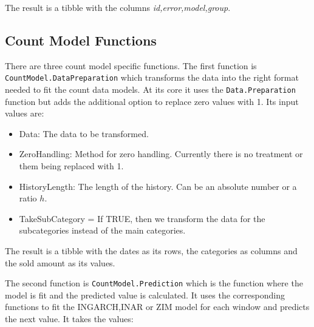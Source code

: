 The result is a tibble with the columns \textit{id,error,model,group}. 

\subsection{Count Model Functions}
\label{sec:Count Model Functions}


There are three count model specific functions. The first function is \texttt{CountModel.DataPreparation} which transforms the data into the right format needed to fit the count data models. At its core it uses the \texttt{Data.Preparation} function but adds the additional option to replace zero values with 1. Its input values are:

\begin{itemize}
	\item Data: The data to be transformed.
	\item ZeroHandling: Method for zero handling. Currently there is no treatment or them being replaced with 1. 
	\item HistoryLength: The length of the history. Can be an absolute number or a ratio $h$. 
	\item TakeSubCategory = If TRUE, then we transform the data for the subcategories instead of the main categories. 
\end{itemize}

The result is a tibble with the dates as its rows, the categories as columns and the sold amount as its values.

The second function is \texttt{CountModel.Prediction} which is the function where the model is fit and the predicted value is calculated. It uses the corresponding functions to fit the INGARCH,INAR or ZIM model for each window and predicts the next value. It takes the values:

